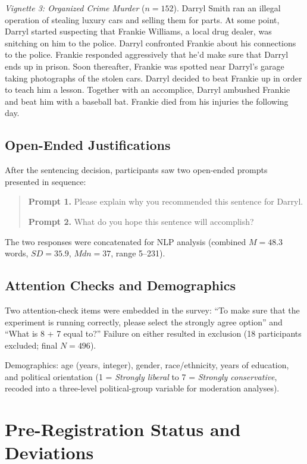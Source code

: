 \textit{Vignette 3: Organized Crime Murder} ($n = 152$). Darryl Smith ran an illegal operation of stealing luxury cars and selling them for parts. At some point, Darryl started suspecting that Frankie Williams, a local drug dealer, was snitching on him to the police. Darryl confronted Frankie about his connections to the police. Frankie responded aggressively that he'd make sure that Darryl ends up in prison. Soon thereafter, Frankie was spotted near Darryl's garage taking photographs of the stolen cars. Darryl decided to beat Frankie up in order to teach him a lesson. Together with an accomplice, Darryl ambushed Frankie and beat him with a baseball bat. Frankie died from his injuries the following day.

\subsection{Open-Ended Justifications}

After the sentencing decision, participants saw two open-ended prompts presented in sequence:

\begin{quote}
\textbf{Prompt 1.} Please explain why you recommended this sentence for Darryl.

\textbf{Prompt 2.} What do you hope this sentence will accomplish?
\end{quote}

The two responses were concatenated for NLP analysis (combined $M = 48.3$ words, $SD = 35.9$, $\mathit{Mdn} = 37$, range 5--231).

\subsection{Attention Checks and Demographics}

Two attention-check items were embedded in the survey: ``To make sure that the experiment is running correctly, please select the strongly agree option'' and ``What is 8 + 7 equal to?'' Failure on either resulted in exclusion (18 participants excluded; final $N = 496$).

Demographics: age (years, integer), gender, race/ethnicity, years of education, and political orientation (1 = \textit{Strongly liberal} to 7 = \textit{Strongly conservative}, recoded into a three-level political-group variable for moderation analyses).

\section{Pre-Registration Status and Deviations}
\label{sec:supp_prereg}


